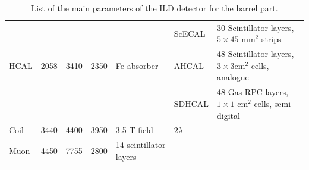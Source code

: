 \begin{table}
\begin{tabular}{ l p{0.05\hsize}p{0.04\hsize}p{0.04\hsize} p{0.20\hsize}p{0.20\hsize}p{0.20\hsize} }
        &           &           &        &             & ScECAL & 30 Scintillator layers,  $ 5\times 45$ mm$^2$ strips \\
HCAL    & 2058      & 3410      & 2350   & Fe absorber & AHCAL & 48 Scintillator layers, $3 \times 3$cm$^2$ cells, analogue \\
        &           &           &         &            & SDHCAL & 48 Gas RPC layers, $1\times 1$ cm$^2$ cells, semi-digital\\
\midrule
Coil    & 3440      & 4400      & 3950    & 3.5 T field & $ 2 \lambda $& \\
Muon    & 4450      & 7755      & 2800    & 14 scintillator layers& &\\
\bottomrule
\end{tabular}
\caption{\label{ild:tab:barrelpara}List of the main parameters of the ILD detector for the barrel part.}
\end{table}

